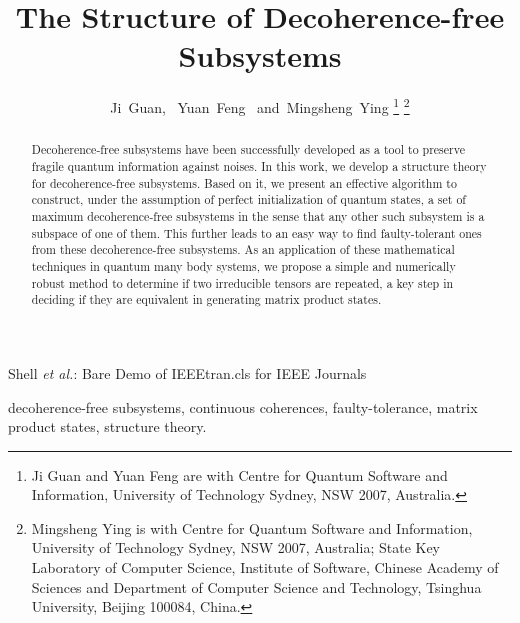 \documentclass[journal]{IEEEtran}
\begin{document}
 \title{The Structure  of Decoherence-free Subsystems}
 
\author{Ji~Guan,%
        ~Yuan~Feng%
        ~and~Mingsheng~Ying%
\thanks{Ji Guan and Yuan Feng are with Centre for Quantum Software and Information,
University of Technology Sydney, NSW 2007, Australia.}%
\thanks{Mingsheng Ying is with Centre for Quantum Software and Information,
University of Technology Sydney, NSW 2007, Australia; State Key Laboratory of Computer Science, Institute of Software, Chinese Academy of Sciences and Department of Computer Science and Technology, Tsinghua University, Beijing 100084, China.}}%

{Shell \MakeLowercase{\textit{et al.}}: Bare Demo of IEEEtran.cls for IEEE Journals}
 \maketitle

\begin{abstract}
Decoherence-free subsystems have been successfully developed as a tool to preserve fragile quantum information against noises.  In this work, we develop a structure theory for decoherence-free subsystems. Based on it, we present an effective algorithm to construct, under the assumption of perfect initialization of quantum states, a set of maximum decoherence-free subsystems in the sense that any other such subsystem is a subspace of one of them. This further leads to an easy way to find faulty-tolerant ones from these decoherence-free subsystems. As an application of these mathematical techniques in quantum many body systems, we propose a simple and numerically robust method to determine if two irreducible tensors are repeated, a key step in deciding if they are equivalent in generating matrix product states.
\end{abstract}

\begin{IEEEkeywords}
decoherence-free subsystems, continuous coherences, faulty-tolerance, matrix product states, structure theory.
\end{IEEEkeywords}
\end{document}
